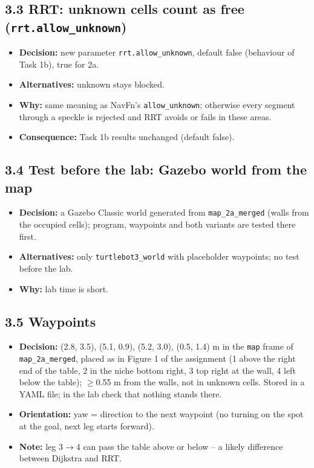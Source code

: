 \documentclass[10pt]{article}
\newcommand{\pkg}[1]{\texttt{#1}}
\begin{document}
\subsection*{3.3 RRT: unknown cells count as free (\pkg{rrt.allow\_unknown})}
\begin{itemize}
  \item \textbf{Decision:} new parameter \pkg{rrt.allow\_unknown}, default false (behaviour of Task 1b), true for 2a.
  \item \textbf{Alternatives:} unknown stays blocked.
  \item \textbf{Why:} same meaning as NavFn's \pkg{allow\_unknown}; otherwise every segment through a speckle is rejected and RRT avoids or fails in these areas.
  \item \textbf{Consequence:} Task 1b results unchanged (default false).
\end{itemize}

\subsection*{3.4 Test before the lab: Gazebo world from the map}
\begin{itemize}
  \item \textbf{Decision:} a Gazebo Classic world generated from \pkg{map\_2a\_merged} (walls from the occupied cells); program, waypoints and both variants are tested there first.
  \item \textbf{Alternatives:} only \pkg{turtlebot3\_world} with placeholder waypoints; no test before the lab.
  \item \textbf{Why:} lab time is short.
\end{itemize}

\subsection*{3.5 Waypoints}
\begin{itemize}
  \item \textbf{Decision:} (2.8, 3.5), (5.1, 0.9), (5.2, 3.0), (0.5, 1.4) m in the \pkg{map} frame of \pkg{map\_2a\_merged}, placed as in Figure 1 of the assignment (1 above the right end of the table, 2 in the niche bottom right, 3 top right at the wall, 4 left below the table); $\geq$0.55 m from the walls, not in unknown cells. Stored in a YAML file; in the lab check that nothing stands there.
  \item \textbf{Orientation:} yaw = direction to the next waypoint (no turning on the spot at the goal, next leg starts forward).
  \item \textbf{Note:} leg 3$\rightarrow$4 can pass the table above or below -- a likely difference between Dijkstra and RRT.
\end{itemize}
\end{document}
